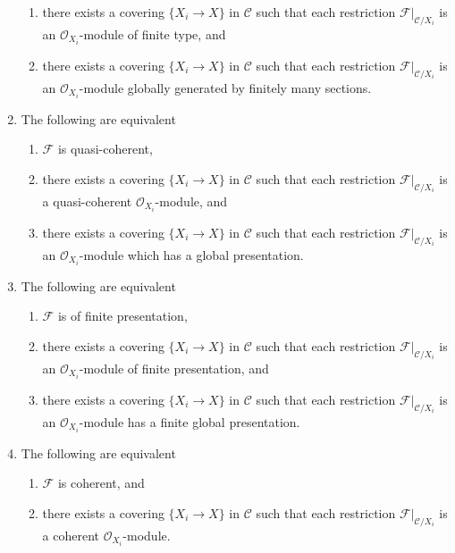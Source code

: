 \begin{lemma}
\begin{enumerate}
\begin{enumerate}
\item there exists a covering $\{X_i \to X\}$ in $\mathcal{C}$
such that each restriction $\mathcal{F}|_{\mathcal{C}/X_i}$
is an $\mathcal{O}_{X_i}$-module of finite type, and
\item there exists a covering $\{X_i \to X\}$ in $\mathcal{C}$
such that each restriction $\mathcal{F}|_{\mathcal{C}/X_i}$
is an $\mathcal{O}_{X_i}$-module globally generated by finitely many sections.
\end{enumerate}
\item The following are equivalent
\begin{enumerate}
\item $\mathcal{F}$ is quasi-coherent,
\item there exists a covering $\{X_i \to X\}$ in $\mathcal{C}$
such that each restriction $\mathcal{F}|_{\mathcal{C}/X_i}$
is a quasi-coherent $\mathcal{O}_{X_i}$-module, and
\item there exists a covering $\{X_i \to X\}$ in $\mathcal{C}$
such that each restriction $\mathcal{F}|_{\mathcal{C}/X_i}$
is an $\mathcal{O}_{X_i}$-module which has a global presentation.
\end{enumerate}
\item The following are equivalent
\begin{enumerate}
\item $\mathcal{F}$ is of finite presentation,
\item there exists a covering $\{X_i \to X\}$ in $\mathcal{C}$
such that each restriction $\mathcal{F}|_{\mathcal{C}/X_i}$
is an $\mathcal{O}_{X_i}$-module of finite presentation, and
\item there exists a covering $\{X_i \to X\}$ in $\mathcal{C}$
such that each restriction $\mathcal{F}|_{\mathcal{C}/X_i}$
is an $\mathcal{O}_{X_i}$-module has a finite global presentation.
\end{enumerate}
\item The following are equivalent
\begin{enumerate}
\item $\mathcal{F}$ is coherent, and
\item there exists a covering $\{X_i \to X\}$ in $\mathcal{C}$
such that each restriction $\mathcal{F}|_{\mathcal{C}/X_i}$
is a coherent $\mathcal{O}_{X_i}$-module.
\end{enumerate}
\end{enumerate}
\end{lemma}

